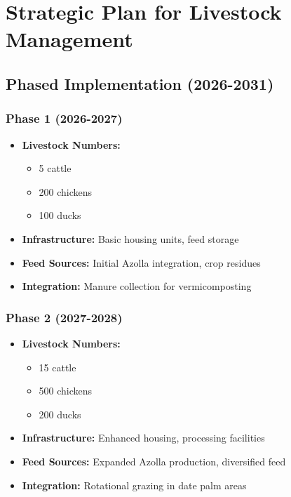 \section{Strategic Plan for Livestock Management}

\subsection{Phased Implementation (2026-2031)}

\subsubsection{Phase 1 (2026-2027)}
\begin{itemize}
    \item \textbf{Livestock Numbers:}
    \begin{itemize}
        \item 5 cattle
        \item 200 chickens
        \item 100 ducks
    \end{itemize}
    \item \textbf{Infrastructure:} Basic housing units, feed storage
    \item \textbf{Feed Sources:} Initial Azolla integration, crop residues
    \item \textbf{Integration:} Manure collection for vermicomposting
\end{itemize}

\subsubsection{Phase 2 (2027-2028)}
\begin{itemize}
    \item \textbf{Livestock Numbers:}
    \begin{itemize}
        \item 15 cattle
        \item 500 chickens
        \item 200 ducks
    \end{itemize}
    \item \textbf{Infrastructure:} Enhanced housing, processing facilities
    \item \textbf{Feed Sources:} Expanded Azolla production, diversified feed
    \item \textbf{Integration:} Rotational grazing in date palm areas
\end{itemize}


